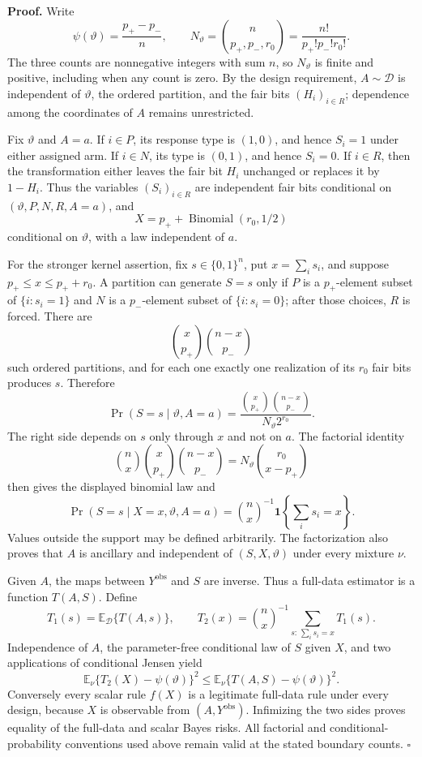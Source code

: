 \textbf{Proof.}
Write
\[
 \psi(\vartheta)=\frac{p_+-p_-}{n},
 \qquad
 N_\vartheta=\binom{n}{p_+,p_-,r_0}
 =\frac{n!}{p_+!p_-!r_0!}.
\]
The three counts are nonnegative integers with sum \(n\), so \(N_\vartheta\) is finite and positive, including when any count is zero. By the design requirement, \(A\sim\mathcal D\) is independent of \(\vartheta\), the ordered partition, and the fair bits \((H_i)_{i\in R}\); dependence among the coordinates of \(A\) remains unrestricted.

Fix \(\vartheta\) and \(A=a\). If \(i\in P\), its response type is \((1,0)\), and hence \(S_i=1\) under either assigned arm. If \(i\in N\), its type is \((0,1)\), and hence \(S_i=0\). If \(i\in R\), then the transformation either leaves the fair bit \(H_i\) unchanged or replaces it by \(1-H_i\). Thus the variables \((S_i)_{i\in R}\) are independent fair bits conditional on \((\vartheta,P,N,R,A=a)\), and
\[
 X=p_++\operatorname{Binomial}(r_0,1/2)
\]
conditional on \(\vartheta\), with a law independent of \(a\).

For the stronger kernel assertion, fix \(s\in\{0,1\}^n\), put \(x=\sum_i s_i\), and suppose \(p_+\leq x\leq p_++r_0\). A partition can generate \(S=s\) only if \(P\) is a \(p_+\)-element subset of \(\{i:s_i=1\}\) and \(N\) is a \(p_-\)-element subset of \(\{i:s_i=0\}\); after those choices, \(R\) is forced. There are
\[
 \binom{x}{p_+}\binom{n-x}{p_-}
\]
such ordered partitions, and for each one exactly one realization of its \(r_0\) fair bits produces \(s\). Therefore
\[
 \Pr(S=s\mid\vartheta,A=a)
 =\frac{\binom{x}{p_+}\binom{n-x}{p_-}}
 {N_\vartheta2^{r_0}}.
\]
The right side depends on \(s\) only through \(x\) and not on \(a\). The factorial identity
\[
 \binom nx\binom{x}{p_+}\binom{n-x}{p_-}
 =N_\vartheta\binom{r_0}{x-p_+}
\]
then gives the displayed binomial law and
\[
 \Pr(S=s\mid X=x,\vartheta,A=a)
 =\binom nx^{-1}\mathbf 1\!\left\{\sum_i s_i=x\right\}.
\]
Values outside the support may be defined arbitrarily. The factorization also proves that \(A\) is ancillary and independent of \((S,X,\vartheta)\) under every mixture \(\nu\).

Given \(A\), the maps between \(Y^{\mathrm{obs}}\) and \(S\) are inverse. Thus a full-data estimator is a function \(T(A,S)\). Define
\[
 T_1(s)=\mathbb E_\mathcal D\{T(A,s)\},
 \qquad
 T_2(x)=\binom nx^{-1}\sum_{s:\,\sum_i s_i=x}T_1(s).
\]
Independence of \(A\), the parameter-free conditional law of \(S\) given \(X\), and two applications of conditional Jensen yield
\[
 \mathbb E_\nu\{T_2(X)-\psi(\vartheta)\}^2
 \leq \mathbb E_\nu\{T(A,S)-\psi(\vartheta)\}^2.
\]
Conversely every scalar rule \(f(X)\) is a legitimate full-data rule under every design, because \(X\) is observable from \((A,Y^{\mathrm{obs}})\). Infimizing the two sides proves equality of the full-data and scalar Bayes risks. All factorial and conditional-probability conventions used above remain valid at the stated boundary counts. \(\square\)